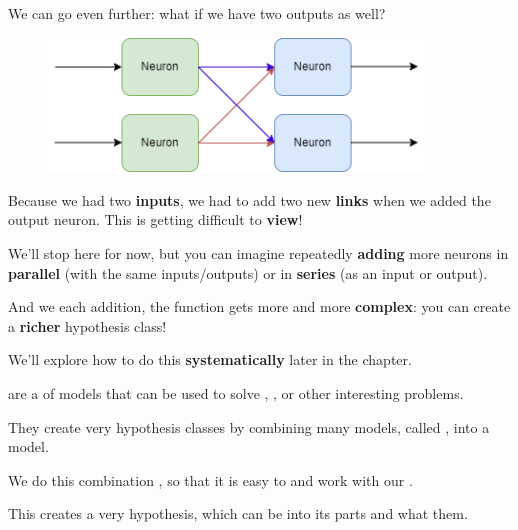         We can go even further: what if we have two outputs as well?
        
        \begin{figure}[H]
        \centering
            \includegraphics[width=100mm,scale=0.4]{images/nn_images/four_neurons.png}
        \end{figure}
        
        Because we had two \textbf{inputs}, we had to add two new \textbf{links} when we added the output neuron. This is getting difficult to \textbf{view}!
        
        We'll stop here for now, but you can imagine repeatedly \textbf{adding} more neurons in \textbf{parallel} (with the same inputs/outputs) or in \textbf{series} (as an input or output).
        
        And we each addition, the function gets more and more \textbf{complex}: you can create a \textbf{richer} hypothesis class!
        
        We'll explore how to do this \textbf{systematically} later in the chapter.
            \\
        
        \begin{definition}
             are a  of models that can be used to solve , , or other interesting problems.
            
            They create very  hypothesis classes by combining many  models, called , into a  model.
            
            We do this combination , so that it is easy to  and work with our .
            
            This creates a very  hypothesis, which can be  into its  parts and what  them.
        \end{definition}
        
